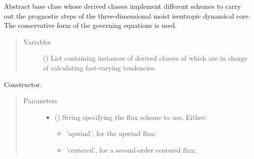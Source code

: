 \documentclass[letterpaper,10pt,english]{sphinxmanual}
\begin{document}
\begin{fulllineitems}
\label{\detokenize{api:dycore.prognostic_isentropic.PrognosticIsentropic}}
Abstract base class whose derived classes implement different schemes to carry out the prognostic steps of
the three-dimensional moist isentropic dynamical core. The conservative form of the governing equations is used.
\begin{quote}\begin{description}
\item[{Variables}] \leavevmode
{\hyperref[\detokenize{api:dycore.dycore.DynamicalCore.fast_tendency_parameterizations}]{}} () \textendash{} List containing instances of derived classes of
 which are in charge of
calculating fast-varying tendencies.

\end{description}\end{quote}

\begin{fulllineitems}
\label{\detokenize{api:dycore.prognostic_isentropic.PrognosticIsentropic.__init__}}
Constructor.
\begin{quote}\begin{description}
\item[{Parameters}] \leavevmode\begin{itemize}
\item {} 
 () \textendash{} 
String specifying the flux scheme to use. Either:
\begin{itemize}
\item {} 
’upwind’, for the upwind flux;

\item {} 
’centered’, for a second-order centered flux;


\end{itemize}
\end{itemize}
\end{description}
\end{quote}
\end{fulllineitems}
\end{fulllineitems}
\end{document}
